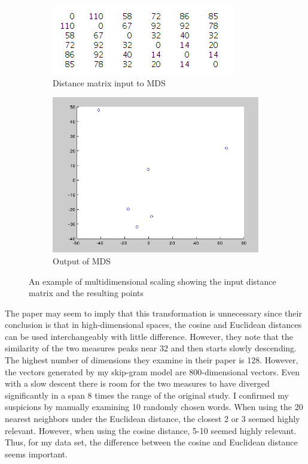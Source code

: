 \begin{figure}[tbp]
    \begin{subfigure}{.5\textwidth}
        \centering
        \includegraphics[width=.8\linewidth]{mds_example_input_matrix}
        \caption{Distance matrix input to MDS}
    \end{subfigure}
    \begin{subfigure}{.5\textwidth}
        \centering
        \includegraphics[width=.8\linewidth]{mds_example_output_plot}
        \caption{Output of MDS}
    \end{subfigure}

    \caption{An example of multidimensional scaling showing the input distance
    matrix and the resulting points}
    \label{fig:mdsexample}
\end{figure}


The paper \citep{Qian2004} may seem to imply that this 
transformation is unnecessary since their conclusion is that in high-dimensional 
spaces, the cosine and Euclidean distances can be used interchangeably with 
little difference. However, they note that the similarity of the two measures 
peaks near 32 and then starts slowly 
descending. The highest number of dimensions they examine in their paper is 128. 
However, the vectors generated by my skip-gram model are 800-dimensional 
vectors. Even with a slow descent there is room for the two measures to have 
diverged significantly in a span 8 times the range of the original study. I 
confirmed my suspicions by manually examining 10 randomly chosen words. When 
using the 20 nearest neighbors under the Euclidean distance, the closest 2 or 3 
seemed highly relevant. However, when using the cosine distance, 5-10 seemed 
highly relevant. Thus, for my data set, the difference between the cosine and 
Euclidean distance seems important. 

